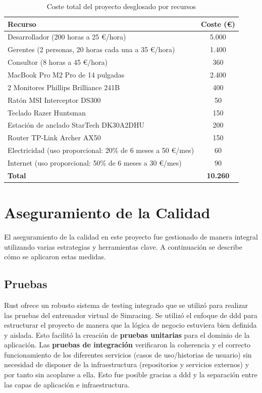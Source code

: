\begin{table}[H]
\centering
\begin{tabular}{|l|c|}
\hline
\textbf{Recurso} & \textbf{Coste (€)} \\ \hline
Desarrollador (200 horas a 25 €/hora) & 5.000 \\ \hline
Gerentes (2 personas, 20 horas cada una a 35 €/hora) & 1.400 \\ \hline
Consultor (8 horas a 45 €/hora) & 360 \\ \hline
MacBook Pro M2 Pro de 14 pulgadas & 2.400 \\ \hline
2 Monitores Phillips Brilliance 241B & 400 \\ \hline
Ratón MSI Interceptor DS300 & 50 \\ \hline
Teclado Razer Huntsman & 150 \\ \hline
Estación de anclado StarTech DK30A2DHU & 200 \\ \hline
Router TP-Link Archer AX50 & 150 \\ \hline
Electricidad (uso proporcional: 20\% de 6 meses a 50 €/mes) & 60 \\ \hline
Internet (uso proporcional: 50\% de 6 meses a 30 €/mes) & 90 \\ \hline
\textbf{Total} & \textbf{10.260} \\ \hline
\end{tabular}
\caption{Coste total del proyecto desglosado por recursos}
\label{tab:costes_proyecto}
\end{table}

\section{Aseguramiento de la Calidad}
El aseguramiento de la calidad en este proyecto fue gestionado de manera integral utilizando varias estrategias y herramientas clave. A continuación se describe cómo se aplicaron estas medidas.

\subsection{Pruebas}
Rust ofrece un robusto sistema de testing integrado que se utilizó para realizar las pruebas del entrenador virtual de Simracing.
Se utilizó el enfoque de \ac{ddd} para estructurar el proyecto de manera que la lógica de negocio estuviera bien definida y aislada. Esto facilitó la creación de \textbf{pruebas unitarias} para el dominio de la aplicación.
Las \textbf{pruebas de integración} verificaron la coherencia y el correcto funcionamiento de los diferentes servicios (casos de uso/historias de usuario) sin necesidad de disponer de la infraestructura (repositorios y servicios externos) y por tanto sin acoplarse a ella. Esto fue posible gracias a \ac{ddd} y la separación entre las capas de aplicación e infraestructura.


